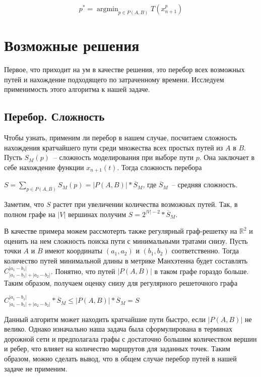 \documentclass[12pt, a4paper]{article}
\DeclareMathOperator*{\argmin}{argmin}
\begin{document}
$$p^* = \argmin_{p \in P(A, B)} T(x^p_{n+1})$$

\newpage
\section*{Возможные решения}

Первое, что приходит на ум в качестве решения, это перебор всех возможных путей и нахождение подходящего по затраченному времени. Исследуем применимость этого алгоритма к нашей задаче.

\subsection*{Перебор. Сложность}
Чтобы узнать, применим ли перебор в нашем случае, посчитаем сложность нахождения кратчайшего пути среди множества всех простых путей из $A$ в $B$. Пусть $S_M(p)$~-- сложность моделирования при выборе пути $p$. Она заключает в себе нахождение функции $x_{n+1}(t)$. Тогда сложность перебора
\begin{center}
 $S = \sum\limits_{p \in P(A,B)} S_M(p) = \vert P(A,B) \vert * \overline S_M$, где $\overline S_M$~-- средняя сложность.
\end{center}
Заметим, что $ S $ растет при увеличении количества возможных путей. Так, в полном графе на $\vert V \vert$ вершинах получим $S = 2^{|V|-2} * \overline S_M$.

В качестве примера можем рассмотерть также регулярный граф-решетку на $\mathbb {R}^2$ и оценить на нем сложность поиска пути с минимальными тратами снизу. Пусть точки $A$ и $B$ имеют координаты $(a_1, a_2)$ и $(b_1, b_2)$ соответственно. Тогда количество путей минимальной длины в метрике Манхэтенна будет составлять $C^{|a_1-b_1|}_{|a_1-b_1| + |a_2-b_2|}$. Понятно, что путей $|P(A,B)|$ в таком графе гораздо больше. Таким образом, получаем оценку снизу для регулярного решеточного графа

\begin{center}
	$C^{|a_1-b_1|}_{|a_1-b_1| + |a_2-b_2|} * \overline S_M  \leq  \vert P(A,B) \vert * \overline S_M = S$
\end{center}


Данный алгоритм может находить кратчайшие пути быстро, если $|P(A,B)|$ не велико. Однако изначально наша задача была сформулирована в терминах дорожной сети и предполагала графы с достаточно большим количеством вершин и ребер, что влияет на количество маршрутов для заданных точек. Таким образом, можно сделать вывод, что в общем случае перебор путей в нашей задаче не применим.
\end{document}
